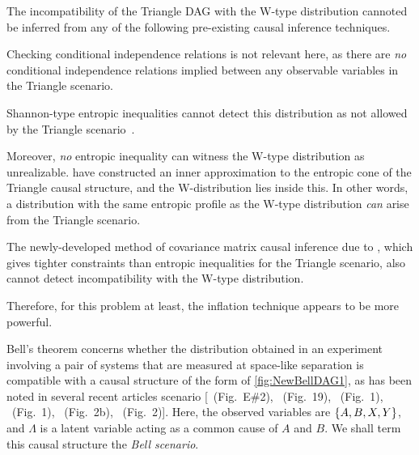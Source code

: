The incompatibility of the Triangle DAG with the W-type distribution cannoted be inferred from any of the following pre-existing causal inference techniques.
\begin{compactenum}
\item Checking conditional independence relations is not relevant here, as there are \emph{no} conditional independence relations implied between any observable variables in the Triangle scenario. %
\item Shannon-type entropic inequalities cannot detect this distribution as not allowed by the Triangle scenario~\cite{fritz2013marginal,chaves2014novel,chaves2014informationinference}. 
\item Moreover, \emph{no} entropic inequality can witness the W-type distribution as unrealizable. \citet{weilenmann2016entropic} have constructed an inner approximation to the entropic cone of the Triangle causal structure, and the W-distribution lies inside this. In other words, a distribution with the same entropic profile as the W-type distribution \emph{can} arise from the Triangle scenario.
\item The newly-developed method of covariance matrix causal inference due to \citet{kela2016covariance}, which gives tighter constraints than entropic inequalities for the Triangle scenario, also cannot detect incompatibility with the W-type distribution.
\end{compactenum}
Therefore, for this problem at least, the inflation technique appears to be more powerful.

\par\smallskip\nobreak

Bell's theorem concerns whether the distribution obtained in an experiment involving a pair of systems that are measured at space-like separation \cite{bell1964einstein,Brunner2013Bell,bell1966lhvm,CHSHOriginal} is compatible with a causal structure of the form of \cref{fig:NewBellDAG1}, as has been noted in several recent articles \cite{bell1964einstein,Brunner2013Bell,bell1966lhvm,CHSHOriginal} scenario [\citealp{pusey2014gdag}~(Fig.~E\#2), \citealp{WoodSpekkens}~(Fig.~19), \citealp{chaves2014novel}~(Fig.~1), \citealp{BeyondBellII}~(Fig.~1), \citealp{wolfe2015nonconvexity}~(Fig.~2b), \citealp{steeg2011relaxation}~(Fig.~2)].  Here, the observed variables are $\left\lbrace A,B,X,Y\right\rbrace$, and $\Lambda$ is a latent variable acting as a common cause of $A$ and $B$.   We shall term this causal structure the \emph{Bell scenario}.

